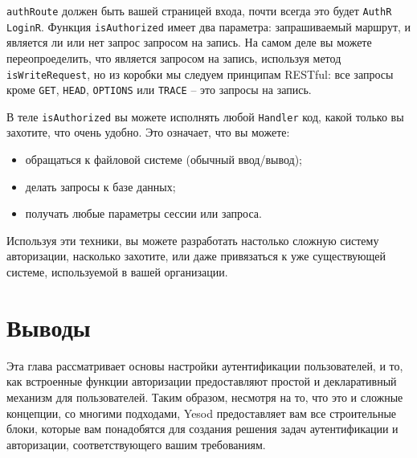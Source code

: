 
\lstinline'authRoute' должен быть вашей страницей входа, почти всегда это будет \lstinline'AuthR LoginR'. Функция \lstinline'isAuthorized' имеет два параметра: запрашиваемый маршрут, и является ли или нет запрос запросом на запись. На самом деле вы можете переопроеделить, что является запросом на запись, используя метод \lstinline'isWriteRequest', но из коробки мы следуем принципам RESTful: все запросы кроме \lstinline'GET', \lstinline'HEAD', \lstinline'OPTIONS' или \lstinline'TRACE' -- это запросы на запись.

В теле \lstinline'isAuthorized' вы можете исполнять любой \lstinline'Handler' код, какой только вы захотите, что очень удобно. Это означает, что вы можете:

\begin{itemize}
    \item обращаться к файловой системе (обычный ввод/вывод);

    \item делать запросы к базе данных;

    \item получать любые параметры сессии или запроса.
\end{itemize}

Используя эти техники, вы можете разработать настолько сложную систему авторизации, насколько захотите, или даже привязаться к уже существующей системе, используемой в вашей организации.

\section{Выводы}

Эта глава рассматривает основы настройки аутентификации пользователей, и то, как встроенные функции авторизации предоставляют простой и декларативный механизм для пользователей. Таким образом, несмотря на то, что это и сложные концепции, со многими подходами, Yesod предоставляет вам все строительные блоки, которые вам понадобятся для создания решения задач аутентификации и авторизации, соответствующего вашим требованиям.
